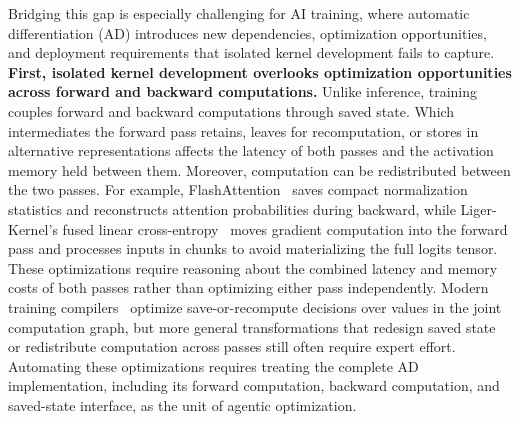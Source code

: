 Bridging this gap is especially challenging for AI training, where automatic differentiation (AD) introduces new dependencies, optimization opportunities, and deployment requirements that isolated kernel development fails to capture.
\textbf{First, isolated kernel development overlooks optimization opportunities across forward and backward computations.} Unlike inference, training couples forward and backward computations through saved state. Which intermediates the forward pass retains, leaves for recomputation, or stores in alternative representations affects the latency of both passes and the activation memory held between them. Moreover, computation can be redistributed between the two passes. For example, FlashAttention~\cite{dao2022flashattention} saves compact normalization statistics and reconstructs attention probabilities during backward, while Liger-Kernel's fused linear cross-entropy~\cite{hsu2024liger} moves gradient computation into the forward pass and processes inputs in chunks to avoid materializing the full logits tensor. These optimizations require reasoning about the combined latency and memory costs of both passes rather than optimizing either pass independently. Modern training compilers~\cite{ansel2024pytorch2} optimize save-or-recompute decisions over values in the joint computation graph, but more general transformations that redesign saved state or redistribute computation across passes still often require expert effort. Automating these optimizations requires treating the complete AD implementation, including its forward computation, backward computation, and saved-state interface, as the unit of agentic optimization.


